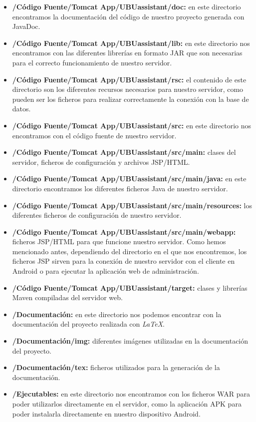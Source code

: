 \begin{itemize}
	\item 
	\textbf{/Código Fuente/Tomcat App/UBUassistant/doc:} en este directorio encontramos la documentación del código de nuestro proyecto generada con JavaDoc.
	\item 
	\textbf{/Código Fuente/Tomcat App/UBUassistant/lib:} en este directorio nos encontramos con las diferentes librerías en formato JAR que son necesarias para el correcto funcionamiento de nuestro servidor.
	\item 
	\textbf{/Código Fuente/Tomcat App/UBUassistant/rsc:} el contenido de este directorio son los diferentes recursos necesarios para nuestro servidor, como pueden ser los ficheros para realizar correctamente la conexión con la base de datos.
	\item 
	\textbf{/Código Fuente/Tomcat App/UBUassistant/src:} en este directorio nos encontramos con el código fuente de nuestro servidor.
	\item 
	\textbf{/Código Fuente/Tomcat App/UBUassistant/src/main:} clases del servidor, ficheros de configuración y archivos JSP/HTML.
	\item 
	\textbf{/Código Fuente/Tomcat App/UBUassistant/src/main/java:} en este directorio encontramos los diferentes ficheros Java de nuestro servidor.
	\item 
	\textbf{/Código Fuente/Tomcat App/UBUassistant/src/main/resources:} los diferentes ficheros de configuración de nuestro servidor.
	\item 
	\textbf{/Código Fuente/Tomcat App/UBUassistant/src/main/webapp:} ficheros JSP/HTML para que funcione nuestro servidor. Como hemos mencionado antes, dependiendo del directorio en el que nos encontremos, los ficheros JSP sirven para la conexión de nuestro servidor con el cliente en Android o para ejecutar la aplicación web de administración.
	\item 
	\textbf{/Código Fuente/Tomcat App/UBUassistant/target:} clases y librerías Maven compiladas del servidor web.
	\item 
	\textbf{/Documentación:} en este directorio nos podemos encontrar con la documentación del proyecto realizada con \textit{LaTeX}.
	\item 
	\textbf{/Documentación/img:} diferentes imágenes utilizadas en la documentación del proyecto.
	\item 
	\textbf{/Documentación/tex:} ficheros utilizados para la generación de la documentación.
	\item 
	\textbf{/Ejecutables:} en este directorio nos encontramos con los ficheros WAR para poder utilizarlos directamente en el servidor, como la aplicación APK para poder instalarla directamente en nuestro dispositivo Android.
\end{itemize}

